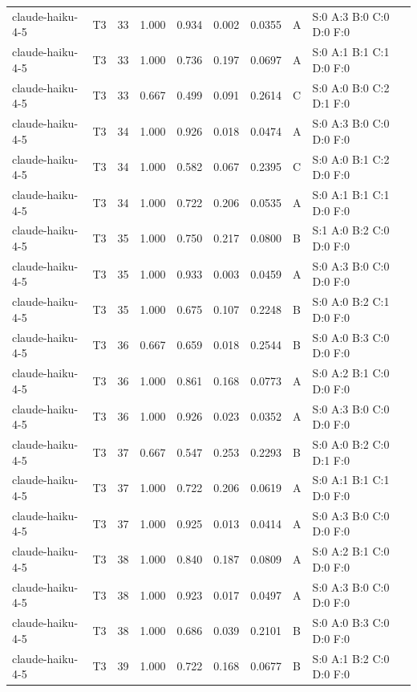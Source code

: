 \begin{longtable}{llrrrrrll}
claude-haiku-4-5 & T3 & 33 & 1.000 & 0.934 & 0.002 & 0.0355 & A & \tiny S:0 A:3 B:0 C:0 D:0 F:0 \\
claude-haiku-4-5 & T3 & 33 & 1.000 & 0.736 & 0.197 & 0.0697 & A & \tiny S:0 A:1 B:1 C:1 D:0 F:0 \\
claude-haiku-4-5 & T3 & 33 & 0.667 & 0.499 & 0.091 & 0.2614 & C & \tiny S:0 A:0 B:0 C:2 D:1 F:0 \\
claude-haiku-4-5 & T3 & 34 & 1.000 & 0.926 & 0.018 & 0.0474 & A & \tiny S:0 A:3 B:0 C:0 D:0 F:0 \\
claude-haiku-4-5 & T3 & 34 & 1.000 & 0.582 & 0.067 & 0.2395 & C & \tiny S:0 A:0 B:1 C:2 D:0 F:0 \\
claude-haiku-4-5 & T3 & 34 & 1.000 & 0.722 & 0.206 & 0.0535 & A & \tiny S:0 A:1 B:1 C:1 D:0 F:0 \\
claude-haiku-4-5 & T3 & 35 & 1.000 & 0.750 & 0.217 & 0.0800 & B & \tiny S:1 A:0 B:2 C:0 D:0 F:0 \\
claude-haiku-4-5 & T3 & 35 & 1.000 & 0.933 & 0.003 & 0.0459 & A & \tiny S:0 A:3 B:0 C:0 D:0 F:0 \\
claude-haiku-4-5 & T3 & 35 & 1.000 & 0.675 & 0.107 & 0.2248 & B & \tiny S:0 A:0 B:2 C:1 D:0 F:0 \\
claude-haiku-4-5 & T3 & 36 & 0.667 & 0.659 & 0.018 & 0.2544 & B & \tiny S:0 A:0 B:3 C:0 D:0 F:0 \\
claude-haiku-4-5 & T3 & 36 & 1.000 & 0.861 & 0.168 & 0.0773 & A & \tiny S:0 A:2 B:1 C:0 D:0 F:0 \\
claude-haiku-4-5 & T3 & 36 & 1.000 & 0.926 & 0.023 & 0.0352 & A & \tiny S:0 A:3 B:0 C:0 D:0 F:0 \\
claude-haiku-4-5 & T3 & 37 & 0.667 & 0.547 & 0.253 & 0.2293 & B & \tiny S:0 A:0 B:2 C:0 D:1 F:0 \\
claude-haiku-4-5 & T3 & 37 & 1.000 & 0.722 & 0.206 & 0.0619 & A & \tiny S:0 A:1 B:1 C:1 D:0 F:0 \\
claude-haiku-4-5 & T3 & 37 & 1.000 & 0.925 & 0.013 & 0.0414 & A & \tiny S:0 A:3 B:0 C:0 D:0 F:0 \\
claude-haiku-4-5 & T3 & 38 & 1.000 & 0.840 & 0.187 & 0.0809 & A & \tiny S:0 A:2 B:1 C:0 D:0 F:0 \\
claude-haiku-4-5 & T3 & 38 & 1.000 & 0.923 & 0.017 & 0.0497 & A & \tiny S:0 A:3 B:0 C:0 D:0 F:0 \\
claude-haiku-4-5 & T3 & 38 & 1.000 & 0.686 & 0.039 & 0.2101 & B & \tiny S:0 A:0 B:3 C:0 D:0 F:0 \\
claude-haiku-4-5 & T3 & 39 & 1.000 & 0.722 & 0.168 & 0.0677 & B & \tiny S:0 A:1 B:2 C:0 D:0 F:0 \\

\end{longtable}
